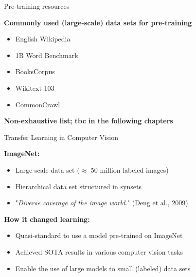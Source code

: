 \documentclass[]{beamer}
\begin{document}
\begin{frame}{Pre-training resources}

	\textbf{Commonly used (large-scale) data sets for pre-training}

	\begin{itemize}
		\item English Wikipedia
		\item 1B Word Benchmark \href{https://arxiv.org/pdf/1312.3005.pdf}{}
		\item BooksCorpus \href{https://www.cv-foundation.org/openaccess/content_iccv_2015/papers/Zhu_Aligning_Books_and_ICCV_2015_paper.pdf}{}
		\item Wikitext-103 \href{https://academictorrents.com/details/a4fee5547056c845e31ab952598f43b42333183c}{}
		\item CommonCrawl \href{https://commoncrawl.org/}{}
	\end{itemize}
	
	\vspace{.3cm}

	\textbf{Non-exhaustive list; tbc in the following chapters}
\end{frame}



\begin{frame}{Transfer Learning in Computer Vision}

	\textbf{ImageNet:} \href{https://www.researchgate.net/profile/Li_Jia_Li/publication/221361415_ImageNet_a_Large-Scale_Hierarchical_Image_Database/links/00b495388120dbc339000000/ImageNet-a-Large-Scale-Hierarchical-Image-Database.pdf}{}

	\begin{itemize}
		\item Large-scale data set ($\approx$ 50 million labeled images)
		\item Hierarchical data set structured in synsets
		\item "\textit{Diverse coverage of the image world.}" (Deng et al., 2009)
	\end{itemize}
	
	\vspace{.3cm}
	
	\textbf{How it changed learning:}
	
	\begin{itemize}
		\item Quasi-standard to use a model pre-trained on ImageNet
		\item Achieved SOTA results in various computer vision tasks
		\item Enable the use of large models to small (labeled) data sets
	\end{itemize}
\end{frame}
\end{document}
